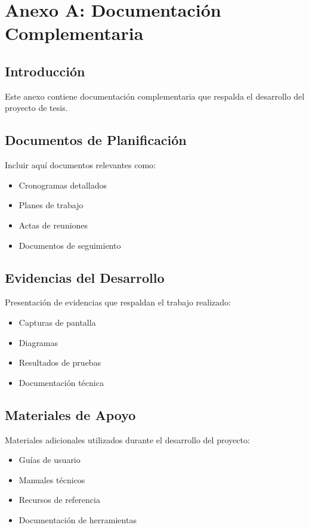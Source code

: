 \chapter{Anexo A: Documentación Complementaria}

\section{Introducción}
Este anexo contiene documentación complementaria que respalda el desarrollo del proyecto de tesis.

\section{Documentos de Planificación}
Incluir aquí documentos relevantes como:
\begin{itemize}
    \item Cronogramas detallados
    \item Planes de trabajo
    \item Actas de reuniones
    \item Documentos de seguimiento
\end{itemize}

\section{Evidencias del Desarrollo}
Presentación de evidencias que respaldan el trabajo realizado:
\begin{itemize}
    \item Capturas de pantalla
    \item Diagramas
    \item Resultados de pruebas
    \item Documentación técnica
\end{itemize}

\section{Materiales de Apoyo}
Materiales adicionales utilizados durante el desarrollo del proyecto:
\begin{itemize}
    \item Guías de usuario
    \item Manuales técnicos
    \item Recursos de referencia
    \item Documentación de herramientas
\end{itemize}